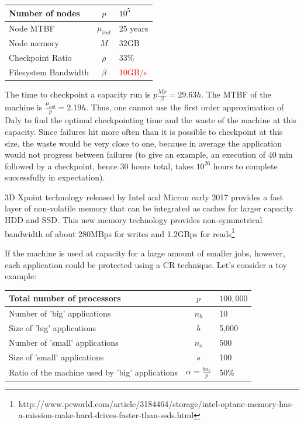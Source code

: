 \documentclass{article}
\begin{document}
\begin{center}
\begin{tabular}{l|c|l}
  Number of nodes & $p$             & $10^5$ \\\hline
  Node MTBF           & $\mu_{ind}$ & 25 years\\\hline
  Node memory      & $M$             & 32GB\\\hline
  Checkpoint Ratio & $\rho$         & 33\%\\\hline
  Filesystem Bandwidth & $\beta$ & \textcolor{red}{10GB/s}\\
\end{tabular}
\end{center}

The time to checkpoint a capacity run is $p\frac{M \rho}{\beta} = 29.63h$. The MTBF of the machine is $\frac{\mu_{ind}}{p} = 2.19h$. Thus, one cannot use the first order approximation of Daly to find the optimal checkpointing time and the waste of the machine at this capacity. Since failures hit more often than it is possible to checkpoint at this size, the waste would be very close to one, because in average the application would not progress between failures (to give an example, an execution of 40 min
followed by a checkpoint, hence 30 hours total, takes $10^{26}$ hours to complete successfully in expectation).

3D Xpoint technology released by Intel and Micron early 2017 provides a fast layer of non-volatile memory that can be integrated as caches for larger capacity HDD and SSD. This new memory technology provides non-symmetrical bandwidth of about 280MBps for writes and 1.2GBps for reads\footnote{http://www.pcworld.com/article/3184464/storage/intel-optane-memory-has-a-mission-make-hard-drives-faster-than-ssds.html}

If the machine is used at capacity for a large amount of smaller jobs, however, each application could be protected using a CR technique. Let's consider a toy example:

\begin{center}
\begin{tabular}{lcl}
  Total number of processors & $p$ & $100,000$\\\hline
  Number of 'big' applications & $n_{b}$ & 10\\\hline
  Size of 'big' applications & $b$ & 5,000\\\hline
  Number of 'small' applications & $n_{s}$ & 500\\\hline
  Size of 'small' applications & $s$ & 100\\\hline
  Ratio of the machine used by 'big' applications & $\alpha = \frac{b n_{b}}{p} $ & 50\%\\
\end{tabular}
\end{center}
\end{document}
